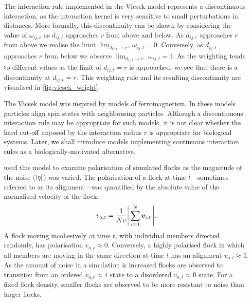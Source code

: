 The interaction rule implemented in the Vicsek model represents a discontinuous
interaction, as the interaction kernel is very sensitive to small perturbations
in distances. More formally, this discontinuity can be shown by considering the
value of $\omega_{ij, t}$ as $d_{ij,t}$ approaches $r$ from above and below. As
$d_{ij,t}$ approaches $r$ from above we realise the limit $\lim_{d_{ij,t}
\rightarrow r^+} \omega_{ij,t} = 0$. Conversely, as $d_{ij,t}$ approaches $r$
from below we observe $\lim_{d_{ij,t} \rightarrow r^-} \omega_{ij,t} = 1$. As
the weighting tends to different values as the limit of $d_{ij,t}=r$ is
approached, we see that there is a discontinuity at $d_{ij,t}=r$. This
weighting rule and its resulting discontinuity are visualised in
\cref{fig:vicsek_weight}.

The Vicsek model was inspired by models of ferromagnetism. In these models
particles align spin states with neighbouring particles. Although a
discontinuous interaction rule may be appropriate for such models, it is not
clear whether the hard cut-off imposed by the interaction radius $r$ is
appropriate for biological systems. Later, we shall introduce models
implementing continuous interaction rules as a biologically-motivated
alternative.

\textcite{vicsek95} used this model to examine polarisation of simulated flocks
as the magnitude of the noise ($\abs{\eta}$) was varied. The polarisation of a
flock at time $t$---sometimes referred to as its alignment---was quantified by
the absolute value of the normalised velocity of the flock:
\begin{equation}
  \label{eq:alignment}
  v_{a,t} = \frac{1}{Nv} \abs{\,\sum_{i=1}^N \bm{v}_{i,t}\,}.
\end{equation}
A flock moving incohesively at time $t$, with individual members directed
randomly, has polarisation $v_{a,t}\approx0$. Conversely, a highly polarised
flock in which all members are moving in the same direction at time $t$ has an
alignment $v_{a,t}\approx1$. As the amount of noise in a simulation is
increased flocks are observed to transition from an ordered $v_{a,t}\approx1$
state to a disordered $v_{a,t}\approx0$ state. For a fixed flock density,
smaller flocks are observed to be more resistant to noise than larger flocks.

